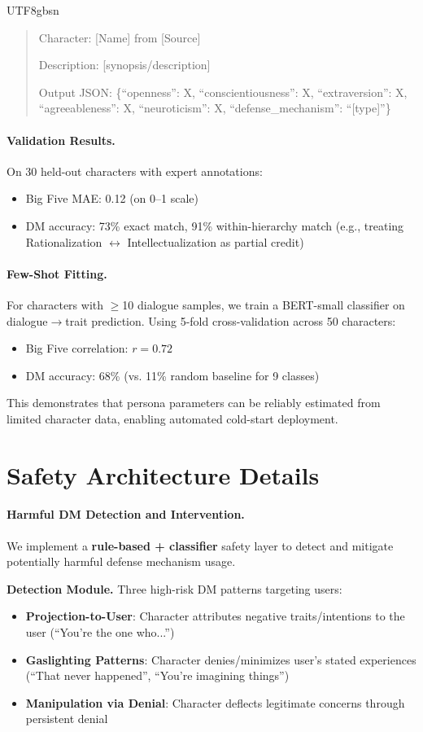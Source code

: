 \documentclass[11pt]{article}
\begin{document}
\begin{CJK*}{UTF8}{gbsn}
\begin{quote}
Character: [Name] from [Source]

Description: [synopsis/description]

Output JSON: \{``openness'': X, ``conscientiousness'': X, ``extraversion'': X, ``agreeableness'': X, ``neuroticism'': X, ``defense\_mechanism'': ``[type]''\}
\end{quote}

\paragraph{Validation Results.} On 30 held-out characters with expert annotations:
\begin{itemize}
    \item Big Five MAE: 0.12 (on 0--1 scale)
    \item DM accuracy: 73\% exact match, 91\% within-hierarchy match (e.g., treating Rationalization $\leftrightarrow$ Intellectualization as partial credit)
\end{itemize}

\paragraph{Few-Shot Fitting.} For characters with $\geq$10 dialogue samples, we train a BERT-small classifier on dialogue$\rightarrow$trait prediction. Using 5-fold cross-validation across 50 characters:
\begin{itemize}
    \item Big Five correlation: $r=0.72$
    \item DM accuracy: 68\% (vs. 11\% random baseline for 9 classes)
\end{itemize}
This demonstrates that persona parameters can be reliably estimated from limited character data, enabling automated cold-start deployment.

\section{Safety Architecture Details}
\label{sec:safety_details}

\paragraph{Harmful DM Detection and Intervention.}
We implement a \textbf{rule-based + classifier} safety layer to detect and mitigate potentially harmful defense mechanism usage.

\textbf{Detection Module.} Three high-risk DM patterns targeting users:
\begin{itemize}
    \item \textbf{Projection-to-User}: Character attributes negative traits/intentions to the user (``You're the one who...'')
    \item \textbf{Gaslighting Patterns}: Character denies/minimizes user's stated experiences (``That never happened'', ``You're imagining things'')
    \item \textbf{Manipulation via Denial}: Character deflects legitimate concerns through persistent denial
\end{itemize}


\end{CJK*}
\end{document}
